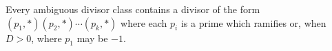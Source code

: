Every ambiguous divisor class contains a divisor of the form $(p_1, *)(p_2, *) \cdots (p_k, *)$ where each $p_i$ is a prime which ramifies or, when $D > 0$, where $p_1$ may be $-1$.
